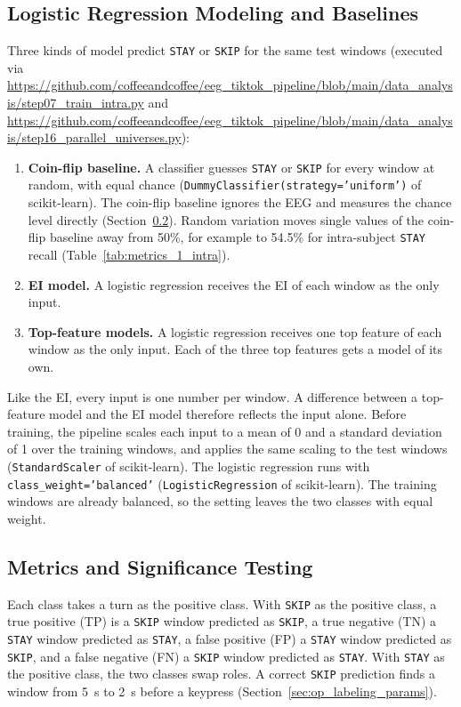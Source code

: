 \documentclass[12pt,a4paper]{report}
\begin{document}
\subsection{Logistic Regression Modeling and Baselines}
\label{sec:method_baselines_and_logistic_regression}
Three kinds of model predict \texttt{STAY} or \texttt{SKIP} for the same test windows (executed via \url{https://github.com/coffeeandcoffee/eeg_tiktok_pipeline/blob/main/data_analysis/step07_train_intra.py} and \url{https://github.com/coffeeandcoffee/eeg_tiktok_pipeline/blob/main/data_analysis/step16_parallel_universes.py}):
\begin{enumerate}
    \item \textbf{Coin-flip baseline.} A classifier guesses \texttt{STAY} or \texttt{SKIP} for every window at random, with equal chance (\texttt{DummyClassifier(strategy='uniform')} of scikit-learn). The coin-flip baseline ignores the EEG and measures the chance level directly (Section~\ref{sec:method_metrics_and_significance}). Random variation moves single values of the coin-flip baseline away from 50\%, for example to 54.5\% for intra-subject \texttt{STAY} recall (Table~\ref{tab:metrics_1_intra}).
    \item \textbf{EI model.} A logistic regression receives the EI of each window as the only input.
    \item \textbf{Top-feature models.} A logistic regression receives one top feature of each window as the only input. Each of the three top features gets a model of its own.
\end{enumerate}
Like the EI, every input is one number per window. A difference between a top-feature model and the EI model therefore reflects the input alone. Before training, the pipeline scales each input to a mean of 0 and a standard deviation of 1 over the training windows, and applies the same scaling to the test windows (\texttt{StandardScaler} of scikit-learn). The logistic regression runs with \texttt{class\_weight='balanced'} (\texttt{LogisticRegression} of scikit-learn). The training windows are already balanced, so the setting leaves the two classes with equal weight.

\subsection{Metrics and Significance Testing}
\label{sec:method_metrics_and_significance}
Each class takes a turn as the positive class. With \texttt{SKIP} as the positive class, a true positive (TP) is a \texttt{SKIP} window predicted as \texttt{SKIP}, a true negative (TN) a \texttt{STAY} window predicted as \texttt{STAY}, a false positive (FP) a \texttt{STAY} window predicted as \texttt{SKIP}, and a false negative (FN) a \texttt{SKIP} window predicted as \texttt{STAY}. With \texttt{STAY} as the positive class, the two classes swap roles. A correct \texttt{SKIP} prediction finds a window from 5~s to 2~s before a keypress (Section~\ref{sec:op_labeling_params}).
\end{document}
